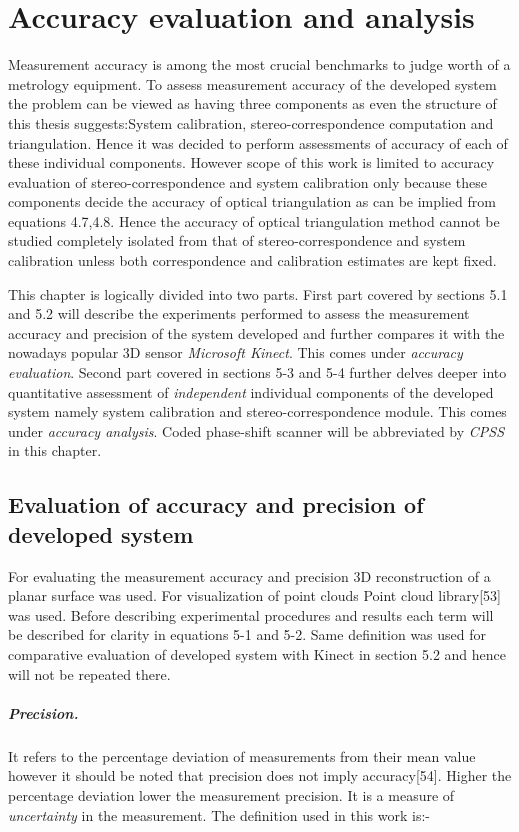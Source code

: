 \chapter{Accuracy evaluation and analysis}
Measurement accuracy is among the most crucial benchmarks to judge worth of a metrology equipment. To assess measurement accuracy of the developed system the problem can be viewed as having three components as even the structure of this thesis suggests:System calibration, stereo-correspondence computation and triangulation. Hence it was decided to perform assessments of accuracy of each of these individual components. However scope of this work is limited to accuracy evaluation of stereo-correspondence and system calibration only because these components decide the accuracy of optical triangulation as can be implied from equations 4.7,4.8. Hence the accuracy of optical triangulation method cannot be studied completely isolated from that of stereo-correspondence and system calibration unless both correspondence and calibration estimates are kept fixed.\newline

This chapter is logically divided into two parts. First part covered by sections 5.1 and 5.2 will describe the experiments performed to assess the measurement accuracy and precision of the system developed and further compares it with the nowadays popular 3D sensor \textit{Microsoft Kinect}. This comes under \textit{accuracy evaluation}. Second part covered in sections 5-3 and 5-4 further delves deeper into quantitative assessment of \textit{independent} individual components of the developed system namely system calibration and stereo-correspondence module. This comes under \textit{accuracy analysis}. Coded phase-shift scanner will be abbreviated by \textit{CPSS} in this chapter.


\section{Evaluation of accuracy and precision of developed system}
For evaluating the measurement accuracy and precision 3D reconstruction of a planar surface was used. For visualization of point clouds Point cloud library[53] was used. Before describing experimental procedures and results each term will be described for clarity in equations 5-1 and 5-2. Same definition was used for comparative evaluation of developed system with Kinect in section 5.2 and hence will not be repeated there.
\paragraph{Precision.}
\label{def:precision}
It refers to the percentage deviation of measurements from their mean value however it should be noted that precision does not imply accuracy[54]. Higher the percentage deviation lower the measurement precision. It is a measure of \textit{uncertainty} in the measurement. The definition used in this work is:-\newline


